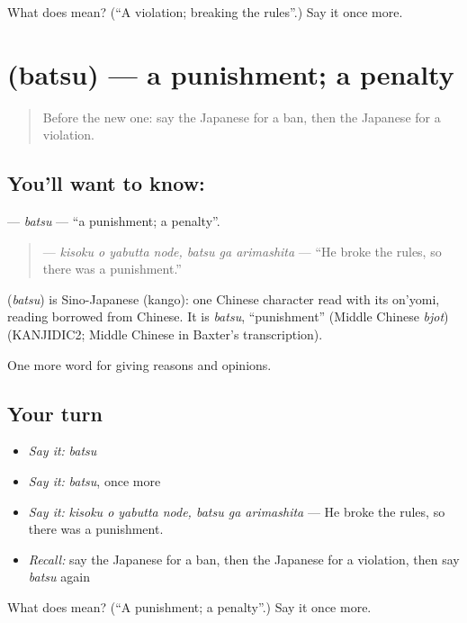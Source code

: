 \begin{tcolorbox}[breakable,colback=teal!4,colframe=teal!35!black,title={Before you move on}]
What does  mean? (\textquotedblleft{}A violation; breaking the rules\textquotedblright{}.) Say it once more.
\end{tcolorbox}
\section[\texorpdfstring{\ja{ばつ} (batsu)}{ばつ (batsu)}]{ (batsu) — a punishment; a penalty}

\label{lesson:JA-C326-batsu}



\begin{quote}
Before the new one: say the Japanese for a ban, then the Japanese for a violation.
\end{quote}

\subsection*{You'll want to know: }
\textbf{} — \emph{batsu} — \textquotedblleft{}a punishment; a penalty\textquotedblright{}.

\begin{quote}
\textbf{  } — \emph{kisoku o yabutta node, batsu ga arimashita} — \textquotedblleft{}He broke the rules, so there was a punishment.\textquotedblright{}
\end{quote}

\begin{cousinweb}
\textbf{} (\emph{batsu}) is Sino-Japanese (kango): one Chinese character read with its on'yomi, reading borrowed from Chinese. It is \emph{batsu}, \textquotedblleft{}punishment\textquotedblright{} (Middle Chinese \emph{bjot}) (KANJIDIC2; Middle Chinese in Baxter's transcription).
\end{cousinweb}

\begin{grammarlens}[title={What you've built}]
One more word for giving reasons and opinions.
\end{grammarlens}

\subsection*{Your turn}
\begin{itemize}
\raggedright
  \item \emph{Say it:} \emph{batsu}
  \item \emph{Say it:} \emph{batsu}, once more
  \item \emph{Say it:} \emph{kisoku o yabutta node, batsu ga arimashita} — He broke the rules, so there was a punishment.
  \item \emph{Recall:} say the Japanese for a ban, then the Japanese for a violation, then say \emph{batsu} again
\end{itemize}

\begin{tcolorbox}[breakable,colback=teal!4,colframe=teal!35!black,title={Before you move on}]
What does  mean? (\textquotedblleft{}A punishment; a penalty\textquotedblright{}.) Say it once more.
\end{tcolorbox}
